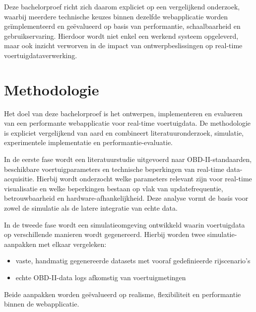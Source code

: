Deze bachelorproef richt zich daarom expliciet op een vergelijkend onderzoek, waarbij meerdere technische keuzes binnen dezelfde webapplicatie worden geïmplementeerd en geëvalueerd op basis van performantie, schaalbaarheid en gebruikservaring. Hierdoor wordt niet enkel een werkend systeem opgeleverd, maar ook inzicht verworven in de impact van ontwerpbeslissingen op real-time voertuigdataverwerking.



\section{Methodologie}%
\label{sec:methodologie}

Het doel van deze bachelorproef is het ontwerpen, implementeren en evalueren van een performante webapplicatie voor real-time voertuigdata. De methodologie is expliciet vergelijkend van aard en combineert literatuuronderzoek, simulatie, experimentele implementatie en performantie-evaluatie.

In de eerste fase wordt een literatuurstudie uitgevoerd naar OBD-II-standaarden, beschikbare voertuigparameters en technische beperkingen van real-time data-acquisitie. Hierbij wordt onderzocht welke parameters relevant zijn voor real-time visualisatie en welke beperkingen bestaan op vlak van updatefrequentie, betrouwbaarheid en hardware-afhankelijkheid. Deze analyse vormt de basis voor zowel de simulatie als de latere integratie van echte data.

In de tweede fase wordt een simulatieomgeving ontwikkeld waarin voertuigdata op verschillende manieren wordt gegenereerd. Hierbij worden twee simulatie-aanpakken met elkaar vergeleken:
\begin{itemize}
    \item vaste, handmatig gegenereerde datasets met vooraf gedefinieerde rijscenario’s
    \item echte OBD-II-data logs afkomstig van voertuigmetingen
\end{itemize}
Beide aanpakken worden geëvalueerd op realisme, flexibiliteit en performantie binnen de webapplicatie.

